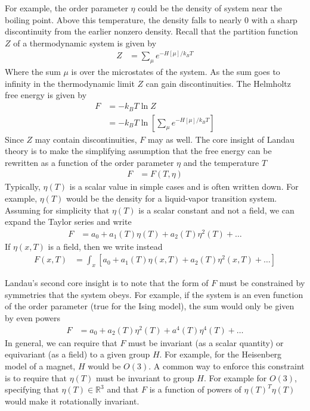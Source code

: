 \documentclass[book.tex]{subfiles}
\begin{document}
For example, the order parameter $\eta$ could be the density of system near the boiling point. Above this temperature, the density falls to nearly $0$ with a sharp discontinuity from the earlier nonzero density. Recall that the partition function $Z$ of a thermodynamic system is given by
\begin{align}
Z &= \sum_{\mu} e^{-H[\mu]/k_B T}
\end{align}
Where the sum $\mu$ is over the microstates of the system. As the sum goes to infinity in the thermodynamic limit $Z$ can gain discontinuities. The Helmholtz free energy is given by
\begin{align}
F &= -k_B T \ln Z \\
&= -k_B T \ln \left [ \sum_{\mu} e^{-H[\mu]/k_B T}\right ]
\end{align}
Since $Z$ may contain discontinuities, $F$ may as well. The core insight of Landau theory is to make the simplifying assumption that the free energy can be rewritten as a function of the order parameter $\eta$ and the temperature $T$
\begin{align}
F &= F(T, \eta)
\end{align}
Typically, $\eta(T)$ is a scalar value in simple cases and is often written down. For example, $\eta(T)$ would be the density for a liquid-vapor transition system. Assuming for simplicity that $\eta(T)$ is a scalar constant and not a field, we can expand the Taylor series and write
\begin{align}
F &= a_0 + a_1(T) \eta(T) + a_2(T) \eta^2(T) + \dotsc 
\end{align}
If $\eta(x, T)$ is a field, then we write instead
\begin{align}
F(x, T) &= \int_x \left [ a_0 + a_1(T) \eta(x, T) + a_2(T) \eta^2(x, T) + \dotsc \right ]
\end{align}

Landau's second core insight is to note that the form of $F$ must be constrained by symmetries that the system obeys. For example, if the system is an even function of the order parameter (true for the Ising model), the sum would only be given by even powers
\begin{align}
F &= a_0 + a_2(T) \eta^2(T) + a^4(T) \eta^4(T) + \dotsc
\end{align}
In general, we can require that $F$ must be invariant (as a scalar quantity) or equivariant (as a field) to a given group $H$. For example, for the Heisenberg model of a magnet, $H$ would be $O(3)$. A common way to enforce this constraint is to require that $\eta(T)$ must be invariant to group $H$. For example for $O(3)$, specifying that $\eta(T) \in \mathbb{R}^3$ and that $F$ is a function of powers of $\eta(T)^T \eta(T)$ would make it rotationally invariant.
\end{document}
